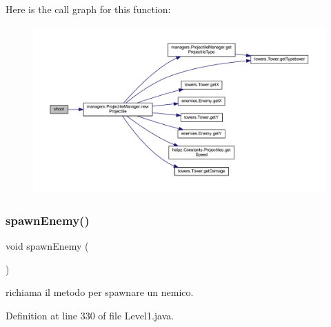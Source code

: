 Here is the call graph for this function\+:
\nopagebreak
\begin{figure}[H]
\begin{center}
\leavevmode
\includegraphics[width=350pt]{classscenes_1_1_level1_a200b073564fc341f34b6112718742bae_cgraph}
\end{center}
\end{figure}
\mbox{\label{classscenes_1_1_level1_addfc0c3129b6ff606f7276e175f31a15}} 
\subsubsection{\texorpdfstring{spawn\+Enemy()}{spawnEnemy()}}
{\footnotesize\ttfamily void spawn\+Enemy (\begin{DoxyParamCaption}{ }\end{DoxyParamCaption})\hspace{0.3cm}{\ttfamily [private]}}



richiama il metodo per spawnare un nemico. 



Definition at line 330 of file Level1.\+java.

